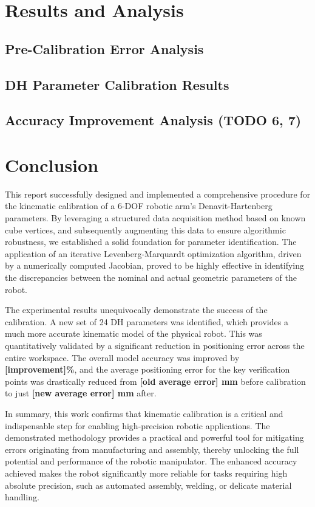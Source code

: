 \documentclass[conference]{IEEEtran}
\begin{document}
\section{Results and Analysis}

\subsection{Pre-Calibration Error Analysis}

\subsection{DH Parameter Calibration Results}

\subsection{Accuracy Improvement Analysis (\textbf{TODO 6, 7})}

\section{Conclusion}
This report successfully designed and implemented a comprehensive procedure for the kinematic calibration of a 6-DOF robotic arm's Denavit-Hartenberg parameters. By leveraging a structured data acquisition method based on known cube vertices, and subsequently augmenting this data to ensure algorithmic robustness, we established a solid foundation for parameter identification. The application of an iterative Levenberg-Marquardt optimization algorithm, driven by a numerically computed Jacobian, proved to be highly effective in identifying the discrepancies between the nominal and actual geometric parameters of the robot.

The experimental results unequivocally demonstrate the success of the calibration. A new set of 24 DH parameters was identified, which provides a much more accurate kinematic model of the physical robot. This was quantitatively validated by a significant reduction in positioning error across the entire workspace. The overall model accuracy was improved by \textbf{[improvement]\%}, and the average positioning error for the key verification points was drastically reduced from \textbf{[old average error] mm} before calibration to just \textbf{[new average error] mm} after.

In summary, this work confirms that kinematic calibration is a critical and indispensable step for enabling high-precision robotic applications. The demonstrated methodology provides a practical and powerful tool for mitigating errors originating from manufacturing and assembly, thereby unlocking the full potential and performance of the robotic manipulator. The enhanced accuracy achieved makes the robot significantly more reliable for tasks requiring high absolute precision, such as automated assembly, welding, or delicate material handling.
\end{document}
